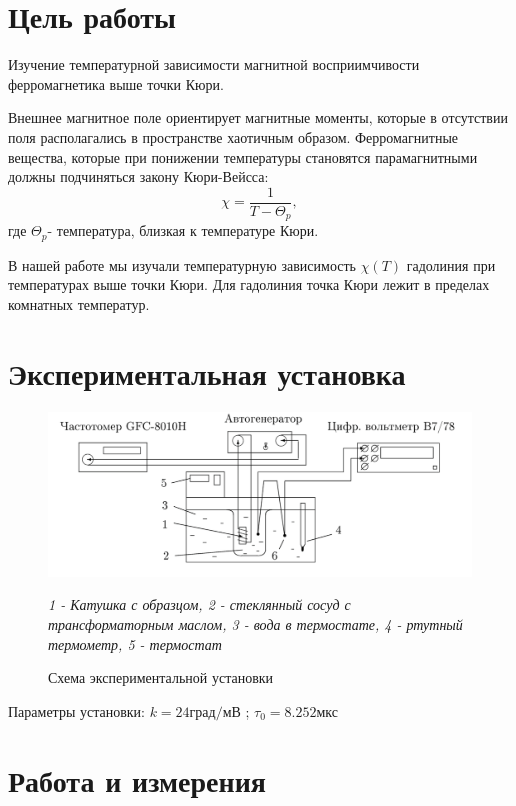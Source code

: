 \documentclass[a4paper, 12pt]{article}
\newenvironment{bottompar}{\par\vspace*{\fill}}{\clearpage}
\begin{document}
\begin{titlepage}
\begin{bottompar}
\end{bottompar}
\vfill %

\end{titlepage}

\section{Цель работы}

Изучение температурной зависимости магнитной восприимчивости ферромагнетика выше точки Кюри.

Внешнее магнитное поле ориентирует магнитные моменты, которые в отсутствии поля располагались в пространстве хаотичным образом. Ферромагнитные вещества, которые при понижении температуры становятся парамагнитными должны подчиняться закону Кюри-Вейсса: $$ \chi = \dfrac{1}{T-\Theta_p}, $$ где 
$\Theta_p$- температура, близкая к температуре Кюри. 

В нашей работе мы изучали температурную зависимость $\chi(T)$ гадолиния при температурах выше точки Кюри. Для гадолиния точка Кюри лежит в пределах комнатных температур.

\section{Экспериментальная установка}

\begin{figure}[H]
\centering
	 \includegraphics[width = 0.8 \textwidth]{Scheme}
\caption{Схема экспериментальной установки}

\textit{1 - Катушка с образцом, 2 - стеклянный сосуд с трансформаторным маслом, 3 - вода в термостате, 4 - ртутный термометр, 5 - термостат}
\end{figure}
Параметры установки: $k = 24 \text{град/мВ}$ ;
$\tau_0 = 8.252 \text{мкс}$

\section{Работа и измерения}
\end{document}
